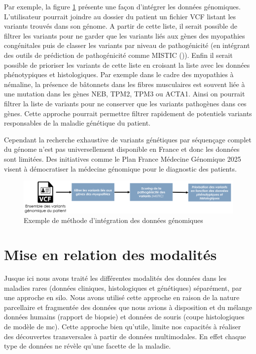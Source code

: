 Par exemple, la figure \ref{fig:variant_discuss} présente une façon d'intégrer les données génomiques. L'utilisateur pourrait joindre au dossier du patient un fichier VCF listant les variants trouvés dans son génome. A partir de cette liste, il serait possible de filtrer les variants pour ne garder que les variants liés aux gènes des myopathies congénitales puis de classer les variants par niveau de pathogénicité (en intégrant des outils de prédiction de pathogénicité comme MISTIC (\cite{chennen_mistic_2020})). Enfin il serait possible de prioriser les variants de cette liste en croisant la liste avec les données phénotypiques et histologiques. Par exemple dans le cadre des myopathies à némaline, la présence de bâtonnets dans les fibres musculaires est souvent liée à une mutation dans les gènes NEB, TPM2, TPM3 ou ACTA1. Ainsi on pourrait filtrer la liste de variants pour ne conserver que les variants pathogènes dans ces gènes. Cette approche pourrait permettre filtrer rapidement de potentiels variants responsables de la maladie génétique du patient.

Cependant la recherche exhaustive de variants génétiques par séquençage complet du génome n'est pas universellement disponible en France et donc les données sont limitées. Des initiatives comme le Plan France Médecine Génomique 2025 visent à démocratiser la médecine génomique pour le diagnostic des patients.
 \begin{figure}[htbp]
 \centering
 \includegraphics[width=1\textwidth]{figures/variant_discuss.png}
 \caption[Exemple de méthode d'intégration des données génomiques]{Exemple de méthode d'intégration des données génomiques}
 \label{fig:variant_discuss}
\end{figure}

\section{Mise en relation des modalités}
Jusque ici nous avons traité les différentes modalités des données dans les maladies rares (données cliniques, histologiques et génétiques) séparément, par une approche en silo. Nous avons utilisé cette approche en raison de la nature parcellaire et fragmentée des données que nous avions à disposition et du mélange données humains (rapport de biopsie) et données de souris (coupe histologiques de modèle de \gls{mc}). Cette approche bien qu'utile, limite nos capacités à réaliser des découvertes transversales à partir de données multimodales. En effet chaque type de données ne révèle qu'une facette de la maladie. 


